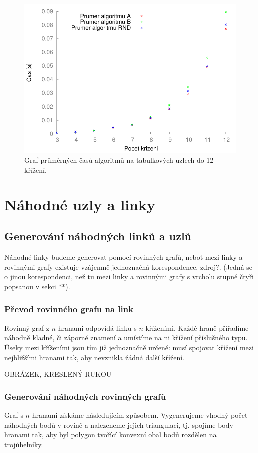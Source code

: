 \begin{figure}[p]\centering
\includegraphics{../img/srovTable}
\caption{Graf průměrných časů algoritmů na tabulkových uzlech do 12 křížení.}
\label{obr03:srovTable}
\end{figure}


\section{Náhodné uzly a linky}

\subsection{Generování náhodných linků a uzlů}
Náhodné linky budeme generovat pomocí rovinných grafů, neboť mezi linky a rovinnými grafy existuje vzájemně jednoznačná korespondence, zdroj?. (Jedná se o jinou korespondenci,  než tu mezi linky a rovinnými grafy s vrcholu stupně čtyři popsanou v sekci **).

\subsubsection{Převod rovinného grafu na link}
Rovinný graf z $n$ hranami odpovídá linku s $n$ kříženími. Každé hraně přířadíme náhodně kladné, či záporné znamení a umístíme na ni křížení příslušného typu. Úseky mezi kříženími jsou tím již jednoznačně určené: musí spojovat křížení mezi nejbližšími hranami tak, aby nevznikla žádná další křížení.

OBRÁZEK, KRESLENÝ RUKOU

\subsubsection{Generování náhodných rovinných grafů}
Graf s $n$ hranami získáme následujícím způsobem. Vygenerujeme vhodný počet náhodných bodů v rovině a nalezeneme jejich triangulaci, tj. spojíme body hranami tak, aby byl polygon tvořící konvexní obal bodů rozdělen na trojúhelníky.


